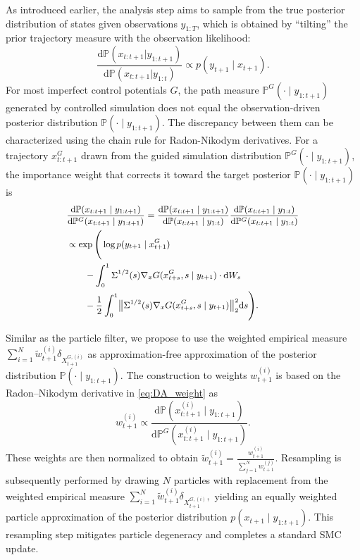 \documentclass{article}
\newcommand{\dif}{{\mathrm{d}}}
\theoremstyle{plain}
\theoremstyle{definition}
\theoremstyle{remark}
\begin{document}
As introduced earlier, the analysis step aims to sample from the true posterior distribution of states given observations $y_{1:T}$, which is obtained by ``tilting'' the prior trajectory measure with the observation likelihood: 
$$
    \frac{\dif \mathbb{P}(x_{t:t+1}|y_{1:t+1}) }{\dif \mathbb{P}(x_{t:t+1}|y_{1:t}) } \propto  p(y_{t+1} \mid x_{t+1}).
$$ 
For most imperfect control potentials $G$, the path measure $\mathbb{P}^{G}(\cdot \mid y_{1:t+1})$ generated by controlled simulation does not equal the observation-driven posterior distribution $\mathbb{P}(\cdot \mid y_{1:t+1})$. The discrepancy between them can be characterized using the chain rule for Radon-Nikodym derivatives. For a trajectory $x_{t:t+1}^{G}$ drawn from the guided simulation distribution $\mathbb{P}^{G}(\cdot \mid y_{1:t+1})$, the importance weight that corrects it toward the target posterior $\mathbb{P}(\cdot \mid y_{1:t+1})$ is
\begin{equation}
\small
\label{eq:DA_weight}
    \begin{aligned}
&\frac{\dif \mathbb{P}(x_{t:t+1} \mid y_{1:t+1})}{\dif \mathbb{P}^{G}(x_{t:t+1} \mid y_{1:t+1})} = \frac{\dif \mathbb{P}(x_{t:t+1} \mid y_{1:t+1})}{\dif \mathbb{P}(x_{t:t+1} \mid y_{1:t})} \frac{\dif \mathbb{P}(x_{t:t+1} \mid y_{1:t})}{\dif \mathbb{P}^{G}(x_{t:t+1} \mid y_{1:t})} \\
&\propto \exp\Bigg( \log p(y_{t+1} \mid x_{t+1}^{G}) \\
&\qquad - \int_0^1 \Sigma^{1/2}(s) \nabla_x G(x_{t+s}^{G}, s \mid y_{t+1}) \cdot \dif W_s \\
&\qquad - \frac{1}{2} \int_0^1 \bigl\| \Sigma^{1/2}(s) \nabla_x  G(x_{t+s}^{G}, s \mid y_{t+1}) \bigr\|_2^2 \dif s \Bigg).
\end{aligned} 
\end{equation}


Similar as the particle filter, we propose to use the weighted empirical measure $\sum_{i=1}^N \tilde w_{t+1}^{(i)}  \delta_{X_{t+1}^{G,(i)}}$ as approximation-free approximation of the posterior
distribution $\mathbb{P}(\cdot \mid y_{1:t+1})$. The construction to weights $w_{t+1}^{(i)}$ is based on the Radon--Nikodym derivative in \eqref{eq:DA_weight} as 
$$
    w_{t+1}^{(i)} \propto
    \frac{\dif \mathbb{P}(x_{t:t+1}^{(i)} \mid y_{1:t+1})}
        {\dif \mathbb{P}^{G}(x_{t:t+1}^{(i)} \mid y_{1:t+1})}.
$$ 
These weights are then normalized to obtain $
\tilde w_{t+1}^{(i)} = \frac{w_{t+1}^{(i)}}{\sum_{j=1}^N w_{t+1}^{(j)}}.
$
Resampling is subsequently performed by drawing $N$ particles with
replacement from the weighted empirical measure $\sum_{i=1}^N \tilde w_{t+1}^{(i)}  \delta_{X_{t+1}^{G,(i)}},$ yielding an equally weighted particle approximation of the posterior
distribution $p(x_{t+1} \mid y_{1:t+1})$. This resampling step
mitigates particle degeneracy and completes a standard SMC update.
\end{document}
